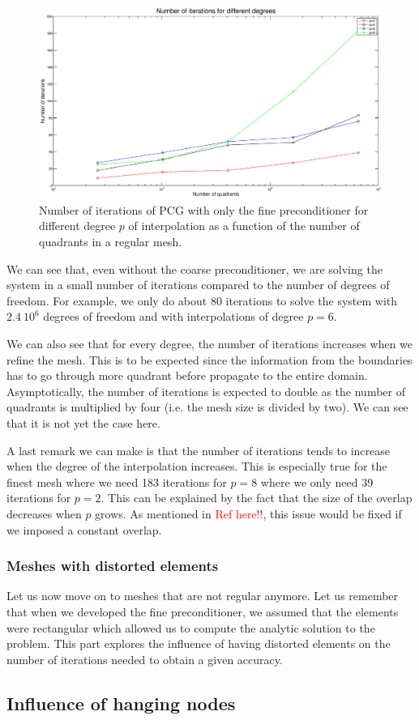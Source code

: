 \begin{figure}
\centering
\includegraphics[scale=0.35]{Results/fine_reg_iter.eps}
\caption{Number of iterations of PCG with only the fine preconditioner for different degree $p$ of interpolation as a function of the number of quadrants in a regular mesh.}
\label{fine_reg_iter} 
\end{figure}

We can see that, even without the coarse preconditioner, we are solving the system in a small number of iterations compared to the number of degrees of freedom. For example, we only do about 80 iterations to solve the system with $2.4\: 10^{6}$ degrees of freedom and with interpolations of degree $p=6$. 

 We can also see that for every degree, the number of iterations increases when we refine the mesh. This is to be expected since the information from the boundaries has to go through more quadrant before propagate to the entire domain. Asymptotically, the number of iterations is expected to double as the number of quadrants is multiplied by four (i.e. the mesh size is divided by two). We can see that it is not yet the case here.

A last remark we can make is that the number of iterations tends to increase when the degree of the interpolation increases. This is especially true for the finest mesh where we need 183 iterations for $p=8$ where we only need 39 iterations for $p=2$. This can be explained by the fact that the size of the overlap decreases when $p$ grows. As mentioned in \textcolor{red}{Ref here!!}, this issue would be fixed if we imposed a constant overlap.

\subsubsection{Meshes with distorted elements}
Let us now move on to meshes that are not regular anymore. Let us remember that when we developed the fine preconditioner, we assumed that the elements were rectangular which allowed us to compute the analytic solution to the problem. This part explores the influence of having distorted elements on the number of iterations needed to obtain a given accuracy.   

\subsection{Influence of hanging nodes}




 
